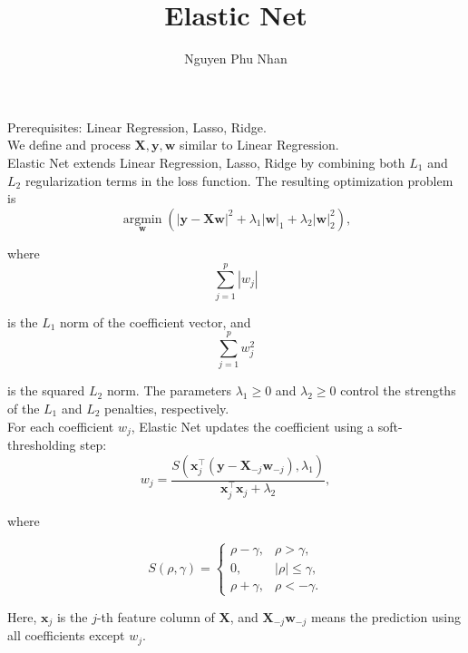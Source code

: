 \documentclass[14pt]{extarticle}
\title{Elastic Net}
\author{Nguyen Phu Nhan}
\date{}
\begin{document}
\maketitle
Prerequisites: Linear Regression, Lasso, Ridge. \\

We define and process $\mathbf{X}, \mathbf{y}, \mathbf{w}$ similar to Linear Regression. \\

Elastic Net extends Linear Regression, Lasso, Ridge by combining both $L_1$ and $L_2$ regularization terms in the loss function. The resulting optimization problem is
\[
\operatorname*{argmin}_{\mathbf{w}}\left(|\mathbf{y}-\mathbf{X}\mathbf{w}|^2 + \lambda_1 |\mathbf{w}|_1 + \lambda_2 |\mathbf{w}|_2^2\right),
\]

where
\[
\sum_{j=1}^{p}|w_j|
\]

is the $L_1$ norm of the coefficient vector, and
\[
\sum_{j=1}^{p}w_j^2
\]

is the squared $L_2$ norm. The parameters $\lambda_1 \ge 0$ and $\lambda_2 \ge 0$ control the strengths of the $L_1$ and $L_2$ penalties, respectively. \\

For each coefficient $w_j$, Elastic Net updates the coefficient using a soft-thresholding step:
\[
w_j = \frac{S\left(\mathbf{x}_j^\top(\mathbf{y}-\mathbf{X}_{-j}\mathbf{w}_{-j}),\lambda_1\right)}{\mathbf{x}_j^\top \mathbf{x}_j+\lambda_2},
\]

where

\[
S(\rho,\gamma)
=
\begin{cases}
\rho-\gamma, & \rho > \gamma, \\
0, & |\rho| \le \gamma, \\
\rho+\gamma, & \rho < -\gamma.
\end{cases}
\]


Here, $\mathbf{x}_j$ is the $j$-th feature column of $\mathbf{X}$, and $\mathbf{X}_{-j}\mathbf{w}_{-j}$ means the prediction using all coefficients except $w_j$.
\end{document}
